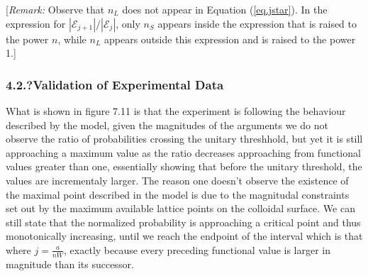 \documentclass[journal=jacsat,manuscript=article]{achemso}
\begin{document}
[\textit{Remark:}  Observe that $n_L$ does not appear in Equation (\ref{eq.jstar}).  
In the expression for $|\mathcal{E}_{j+1}|/|\mathcal{E}_j|$,   only $n_S$ appears inside the 
expression that is raised to the power $n$, while $n_L$ appears outside this expression and is
raised to the power 1.]  



\subsubsection{4.2.?Validation of Experimental Data}

What is shown in figure 7.11 is that the experiment is following the behaviour described by the model, given the magnitudes of the arguments we do not observe the ratio of probabilities crossing the unitary threshhold, but yet it is still approaching a maximum value as the ratio decreases approaching from functional values greater than one, essentially showing that before the unitary threshold, the values are incrementaly larger. The reason one doesn't observe the existence of the  maximal point described in the model is due to the magnitudal constraints set out by the maximum available lattice points on the colloidal surface. We can still state that the normalized probability is approaching a critical point and thus monotonically increasing, until we reach the endpoint of the interval which is that where $j=\frac{a}{nW}$, exactly because every preceding functional value is larger in magnitude than its successor.
\end{document}
